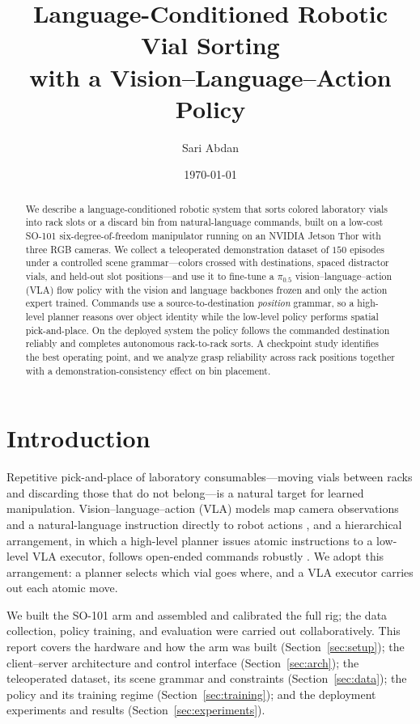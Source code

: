 \documentclass[11pt]{article}
\title{\textbf{Language-Conditioned Robotic Vial Sorting\\with a Vision--Language--Action Policy}}
\author{Sari Abdan}
\date{\today}
\begin{document}
\maketitle

\begin{abstract}
We describe a language-conditioned robotic system that sorts colored laboratory
vials into rack slots or a discard bin from natural-language commands, built on a
low-cost SO-101 six-degree-of-freedom manipulator running on an NVIDIA Jetson Thor
with three RGB cameras. We collect a teleoperated demonstration dataset of $150$
episodes under a controlled scene grammar---colors crossed with destinations,
spaced distractor vials, and held-out slot positions---and use it to fine-tune a
$\pi_{0.5}$ vision--language--action (VLA) flow policy with the vision and language
backbones frozen and only the action expert trained. Commands use a
source-to-destination \emph{position} grammar, so a high-level planner reasons over
object identity while the low-level policy performs spatial pick-and-place. On the
deployed system the policy follows the commanded destination reliably and completes
autonomous rack-to-rack sorts. A checkpoint study identifies the best operating
point, and we analyze grasp reliability across rack positions together with a
demonstration-consistency effect on bin placement.
\end{abstract}

\section{Introduction}
Repetitive pick-and-place of laboratory consumables---moving vials between racks
and discarding those that do not belong---is a natural target for learned
manipulation. Vision--language--action (VLA) models map camera observations and a
natural-language instruction directly to robot actions \citep{rt2,black2024pi0},
and a hierarchical arrangement, in which a high-level planner issues atomic
instructions to a low-level VLA executor, follows open-ended commands robustly
\citep{shi2025hirobot}. We adopt this arrangement: a planner selects which vial
goes where, and a VLA executor carries out each atomic move.

We built the SO-101 arm and assembled and calibrated the full rig; the data
collection, policy training, and evaluation were carried out collaboratively. This
report covers the hardware and how the arm was built (Section~\ref{sec:setup}); the
client--server architecture and control interface (Section~\ref{sec:arch}); the
teleoperated dataset, its scene grammar and constraints (Section~\ref{sec:data});
the policy and its training regime (Section~\ref{sec:training}); and the deployment
experiments and results (Section~\ref{sec:experiments}).
\end{document}
